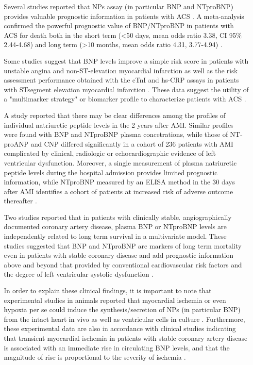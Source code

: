 \documentclass[14pt,a4paper,onecolumn]{extarticle}
\begin{document}
Several studies reported that NPs assay (in particular BNP and NTproBNP) provides valuable prognostic information in patients with ACS \citep{bib3117} \citep{bib3138} \citep{bib3223} \citep{bib3224} \citep{bib3225} \citep{bib3226} \citep{bib3227} \citep{bib3228} \citep{bib3229} \citep{bib3230} \citep{bib3231}. A meta-analysis confirmed the powerful prognostic value of BNP/NTproBNP in patients with ACS for death both in the short term (<50 days, mean odds ratio 3.38, CI 95\% 2.44-4.68) and long term (>10 months, mean odds ratio 4.31, 3.77-4.94) \citep{bib376}.

Some studies suggest that BNP levels improve a simple risk score in patients with unstable angina and non-ST-elevation myocardial infarction \citep{bib3239} as well as the risk assessment performance obtained with the cTnI and hs-CRP assays in patients with STsegment elevation myocardial infarction \citep{bib3234}. These data suggest the utility of a "multimarker strategy" or biomarker profile to characterize patients with ACS \citep{bib378}.

A study reported that there may be clear differences among the profiles of individual natriuretic peptide levels in the 2 years after AMI. Similar profiles were found with BNP and NTproBNP plasma concetrations, while those of NT-proANP and CNP differed significantly in a cohort of 236 patients with AMI complicated by clinical, radiologic or echocardiographic evidence of left ventricular dysfunction. Moreover, a single measurement of plasma natriuretic peptide levels during the hospital admission provides limited prognostic information, while NTproBNP measured by an ELISA method in the 30 days after AMI identifies a cohort of patients at increased risk of adverse outcome thereafter \citep{bib3240}.

Two  studies reported that in patients with clinically stable, angiographically documented coronary artery disease, plasma BNP \citep{bib3241} or NTproBNP \citep{bib3242} levels are independently related to long term survival in a multivariate model. These studies suggested that BNP and NTproBNP are markers of long term mortality even in patients with stable coronary disease and add prognostic information above and beyond that provided by conventional cardiovascular risk factors and the degree of left ventricular systolic dysfunction \citep{bib3241} \citep{bib3242}.

In order to explain these clinical findings, it is important to note that experimental studies in animals reported that myocardial ischemia or even hypoxia per se could induce the synthesis/secretion of NPs (in particular BNP) from the intact heart in vivo as well as ventricular cells in culture \citep{bib3243} \citep{bib3244}. Furthermore, these experimental data are also in accordance with  clinical studies indicating that transient myocardial ischemia in patients with stable coronary artery disease is associated with an immediate rise in circulating BNP levels, and that the magnitude of rise is proportional to the severity of ischemia \citep{bib3163} \citep{bib3164} \citep{bib3246}.
\end{document}
